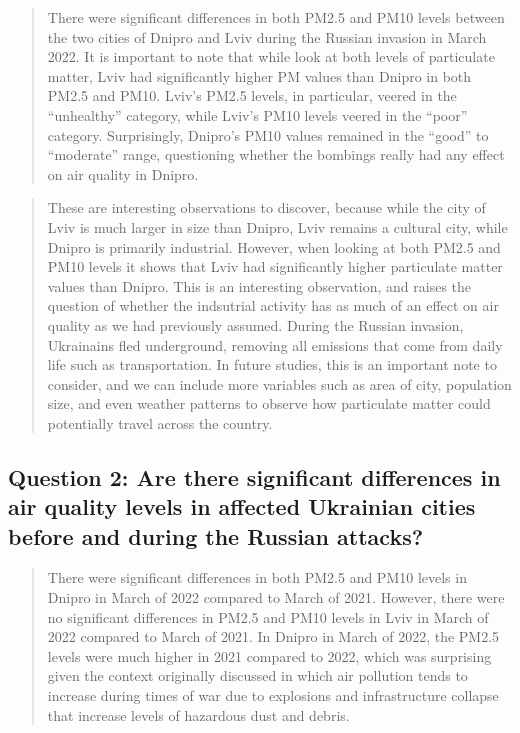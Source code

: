 \documentclass[
  12pt,
]{article}
\begin{document}
\begin{quote}
There were significant differences in both PM2.5 and PM10 levels between
the two cities of Dnipro and Lviv during the Russian invasion in March
2022. It is important to note that while look at both levels of
particulate matter, Lviv had significantly higher PM values than Dnipro
in both PM2.5 and PM10. Lviv's PM2.5 levels, in particular, veered in
the ``unhealthy'' category, while Lviv's PM10 levels veered in the
``poor'' category. Surprisingly, Dnipro's PM10 values remained in the
``good'' to ``moderate'' range, questioning whether the bombings really
had any effect on air quality in Dnipro.
\end{quote}

\begin{quote}
These are interesting observations to discover, because while the city
of Lviv is much larger in size than Dnipro, Lviv remains a cultural
city, while Dnipro is primarily industrial. However, when looking at
both PM2.5 and PM10 levels it shows that Lviv had significantly higher
particulate matter values than Dnipro. This is an interesting
observation, and raises the question of whether the indsutrial activity
has as much of an effect on air quality as we had previously assumed.
During the Russian invasion, Ukrainains fled underground, removing all
emissions that come from daily life such as transportation. In future
studies, this is an important note to consider, and we can include more
variables such as area of city, population size, and even weather
patterns to observe how particulate matter could potentially travel
across the country.
\end{quote}

\hypertarget{question-2-are-there-significant-differences-in-air-quality-levels-in-affected-ukrainian-cities-before-and-during-the-russian-attacks-1}{%
\subsection{Question 2: Are there significant differences in air quality
levels in affected Ukrainian cities before and during the Russian
attacks?}\label{question-2-are-there-significant-differences-in-air-quality-levels-in-affected-ukrainian-cities-before-and-during-the-russian-attacks-1}}

\begin{quote}
There were significant differences in both PM2.5 and PM10 levels in
Dnipro in March of 2022 compared to March of 2021. However, there were
no significant differences in PM2.5 and PM10 levels in Lviv in March of
2022 compared to March of 2021. In Dnipro in March of 2022, the PM2.5
levels were much higher in 2021 compared to 2022, which was surprising
given the context originally discussed in which air pollution tends to
increase during times of war due to explosions and infrastructure
collapse that increase levels of hazardous dust and debris.
\end{quote}
\end{document}
